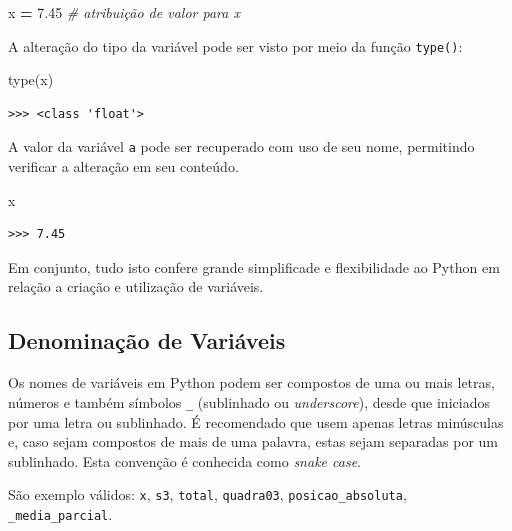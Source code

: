 \documentclass[
]{book}
\newenvironment{Shaded}{\begin{snugshade}}{\end{snugshade}}
\newcommand{\BuiltInTok}[1]{#1}
\newcommand{\CommentTok}[1]{\textcolor[rgb]{0.56,0.35,0.01}{\textit{#1}}}
\newcommand{\FloatTok}[1]{\textcolor[rgb]{0.00,0.00,0.81}{#1}}
\newcommand{\NormalTok}[1]{#1}
\newcommand{\OperatorTok}[1]{\textcolor[rgb]{0.81,0.36,0.00}{\textbf{#1}}}
\begin{document}
\begin{Shaded}
\begin{Highlighting}[]
\NormalTok{x }\OperatorTok{=} \FloatTok{7.45} \CommentTok{\# atribuição de valor para x}
\end{Highlighting}
\end{Shaded}

A alteração do tipo da variável pode ser visto por meio da função \texttt{type()}:

\begin{Shaded}
\begin{Highlighting}[]
\BuiltInTok{type}\NormalTok{(x)}
\end{Highlighting}
\end{Shaded}

\begin{verbatim}
>>> <class 'float'>
\end{verbatim}

A valor da variável \texttt{a} pode ser recuperado com uso de seu nome, permitindo verificar a alteração em seu conteúdo.

\begin{Shaded}
\begin{Highlighting}[]
\NormalTok{x}
\end{Highlighting}
\end{Shaded}

\begin{verbatim}
>>> 7.45
\end{verbatim}

Em conjunto, tudo isto confere grande simplificade e flexibilidade ao Python em relação a criação e utilização de variáveis.

\hypertarget{comput-varia-nomes}{%
\subsection{Denominação de Variáveis}\label{comput-varia-nomes}}

Os nomes de variáveis em Python podem ser compostos de uma ou mais letras, números e também símbolos \texttt{\_} (sublinhado ou \emph{underscore}), desde que iniciados por uma letra ou sublinhado. É recomendado que usem apenas letras minúsculas e, caso sejam compostos de mais de uma palavra, estas sejam separadas por um sublinhado. Esta convenção é conhecida como \emph{snake case}.

São exemplo válidos: \texttt{x}, \texttt{s3}, \texttt{total}, \texttt{quadra03}, \texttt{posicao\_absoluta}, \texttt{\_media\_parcial}.
\end{document}
